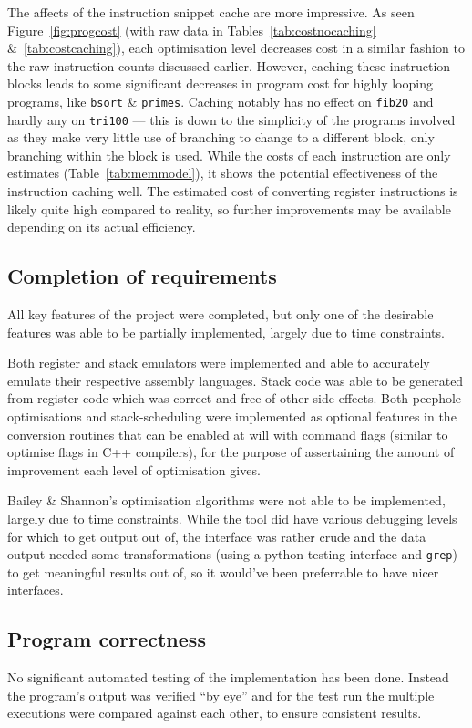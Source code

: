 The affects of the instruction snippet cache are more impressive. As seen
Figure~\ref{fig:progcost} (with raw data in Tables~\ref{tab:costnocaching}
\&~\ref{tab:costcaching}), each optimisation level decreases cost in a similar
fashion to the raw instruction counts discussed earlier. However, caching these
instruction blocks leads to some significant decreases in program cost for
highly looping programs, like \texttt{bsort} \& \texttt{primes}. Caching notably
has no effect on \texttt{fib20} and hardly any on \texttt{tri100} --- this is
down to the simplicity of the programs involved as they make very little use of
branching to change to a different block, only branching within the block is
used. While the costs of each instruction are only estimates
(Table~\ref{tab:memmodel}), it shows the potential effectiveness of the
instruction caching well. The estimated cost of converting register instructions
is likely quite high compared to reality, so further improvements may be
available depending on its actual efficiency.

\subsection{Completion of requirements}
All key features of the project were completed, but only one of the desirable
features was able to be partially implemented, largely due to time constraints.

Both register and stack emulators were implemented and able to accurately
emulate their respective assembly languages. Stack code was able to be generated
from register code which was correct and free of other side effects. Both
peephole optimisations and stack-scheduling were implemented as optional
features in the conversion routines that can be enabled at will with command
flags (similar to optimise flags in C++ compilers), for the purpose of
assertaining the amount of improvement each level of optimisation gives.

Bailey \& Shannon's optimisation algorithms were not able to be implemented,
largely due to time constraints. While the tool did have various debugging
levels for which to get output out of, the interface was rather crude and the
data output needed some transformations (using a python testing interface and
\texttt{grep}) to get meaningful results out of, so it would've been preferrable
to have nicer interfaces.

\subsection{Program correctness}
No significant automated testing of the implementation has been done. Instead
the program's output was verified ``by eye'' and for the test run the multiple
executions were compared against each other, to ensure consistent results.

